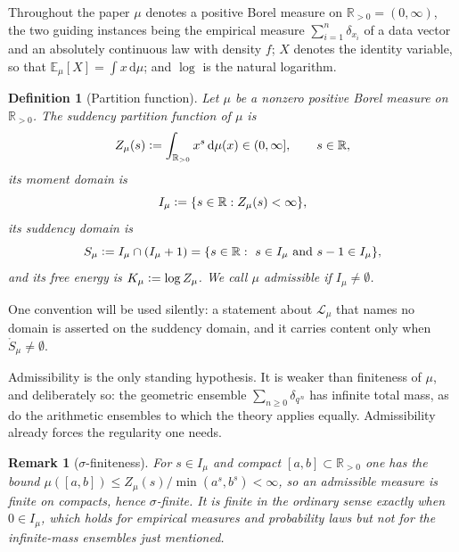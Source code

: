 \documentclass[sn-mathphys-num]{sn-jnl}
\theoremstyle{thmstyleone}%
\theoremstyle{thmstyletwo}%
\newtheorem{remark}{Remark}%
\theoremstyle{thmstylethree}%
\newtheorem{definition}{Definition}%
\theoremstyle{thmstyleone}%
\providecommand{\R}{\mathbb{R}}
\providecommand{\E}{\mathbb{E}}
\providecommand{\Rpos}{\mathbb{R}_{>0}}
\providecommand{\Leh}{\mathscr{L}}
\providecommand{\dd}{\,\mathrm{d}}
\providecommand{\eqdef}{\mathrel{\vcentcolon=}}
\begin{document}
	Throughout the paper $\mu$ denotes a positive Borel measure on
	$\Rpos=(0,\infty)$, the two guiding instances being the empirical
	measure $\sum_{i=1}^n\delta_{x_i}$ of a data vector and an absolutely
	continuous law with density $f$; $X$ denotes the identity variable, so
	that $\E_\mu[X]=\int x\dd\mu$; and $\log$ is the natural
	logarithm.
	
	\begin{definition}[Partition function]\label{def:Z}
		Let $\mu$ be a nonzero positive Borel measure on $\Rpos$. The
		\emph{suddency partition function} of $\mu$ is
		\begin{equation}\label{eq:defZ}
			Z_\mu(s)\eqdef\int_{\Rpos}x^{s}\dd\mu(x)\in(0,\infty],
			\qquad s\in\R,
		\end{equation}
		its \emph{moment domain} is
		\begin{equation}\label{eq:defI}
			I_\mu\eqdef\{s\in\R:Z_\mu(s)<\infty\},
		\end{equation}
		its \emph{suddency domain} is
		\begin{equation}\label{eq:defS}
			S_\mu\eqdef I_\mu\cap(I_\mu+1)
			=\{s\in\R:\ s\in I_\mu\ \text{and}\ s-1\in I_\mu\},
		\end{equation}
		and its \emph{free energy} is $K_\mu\eqdef\log Z_\mu$. We call
		$\mu$ \emph{admissible} if $I_\mu\neq\emptyset$.
	\end{definition}
	
	One convention will be used silently: a statement about
	$\Leh_\mu$ that names no domain is asserted on the suddency
	domain, and it carries content only when
	$\mathring S_\mu\neq\emptyset$.
	
	Admissibility is the only standing hypothesis. It is weaker than
	finiteness of $\mu$, and deliberately so: the geometric ensemble
	$\sum_{n\ge0}\delta_{q^{\,n}}$ has
	infinite total mass, as do the arithmetic ensembles to which the
	theory applies equally. Admissibility already forces the
	regularity one needs.
	
	\begin{remark}[$\sigma$-finiteness]\label{rem:sigmafinite}
		For $s\in I_\mu$ and compact $[a,b]\subset\Rpos$ one has the
		bound $\mu([a,b])\le Z_\mu(s)/\min(a^{s},b^{s})<\infty$, so
		an admissible measure is finite on compacts, hence
		$\sigma$-finite.
		It is finite in the ordinary sense exactly when $0\in I_\mu$,
		which holds for empirical measures and probability laws but not
		for the infinite-mass ensembles just mentioned.
	\end{remark}
	
\end{document}
